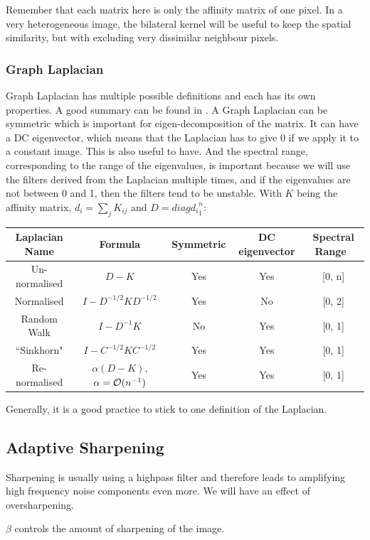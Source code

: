 Remember that each matrix here is only the affinity matrix of one pixel.
In a very heterogeneous image, the bilateral kernel will be useful to keep the spatial similarity, but with excluding very dissimilar neighbour pixels.

\subsubsection{Graph Laplacian}
Graph Laplacian has multiple possible definitions and each has its own properties.
A good summary can be found in \cite{siam_slides_2016}.
A Graph Laplacian can be symmetric which is important for eigen-decomposition of the matrix.
It can have a DC eigenvector, which means that the Laplacian has to give 0 if we apply it to a constant image. This is also useful to have.
And the spectral range, corresponding to the range of the eigenvalues, is important because we will use the filters derived from the Laplacian multiple times, and if the eigenvalues are not between 0 and 1, then the filters tend to be unstable.
With \(K\) being the affinity matrix, \(d_i = \sum_j K_{ij}\) and \(D = diag{d_i}^n_1\):

\begin{table}[!htbp]
 \centering
 \begin{tabular}{|c|c|c|c|c|}
  \hline
  Laplacian Name & Formula & Symmetric & DC eigenvector & Spectral Range \\
  \hline
  Un-normalised & \(D - K\) & Yes & Yes & [0, n] \\
  \hline
  Normalised & \(I - D^{-1/2}KD^{-1/2}\) & Yes & No & [0, 2] \\
  \hline
  Random Walk & \(I - D^{-1}K\) & No & Yes & [0, 1] \\
  \hline
  ``Sinkhorn" \cite{milanfar_symmetrizing_2013} & \(I - C^{-1/2}KC^{-1/2}\) & Yes & Yes & [0, 1] \\
  \hline
  Re-normalised & \(\alpha(D - K)\), \(\alpha = \operatorname{\mathcal{O}}(n^{-1})\) & Yes & Yes & [0, 1] \\
  \hline
 \end{tabular}
\end{table}

Generally, it is a good practice to stick to one definition of the Laplacian.

\subsection{Adaptive Sharpening}

Sharpening is usually using a highpass filter and therefore leads to amplifying high frequency noise components even more.
We will have an effect of oversharpening.

\(\beta \) controls the amount of sharpening of the image.


